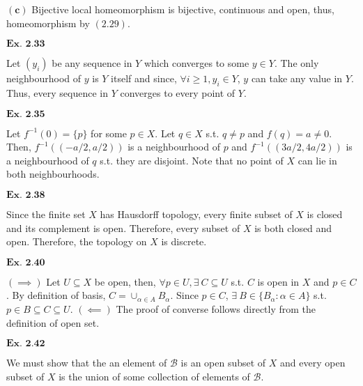 \documentclass{article}
\begin{document}
$\mathbf{(c)}$ Bijective local homeomorphism is bijective, continuous and open, thus, homeomorphism by $\mathbf{(2.29)}$.

\vspace{0.2in}

${\textbf{Ex. 2.33}}$

Let $(y_i)$ be any sequence in $Y$ which converges to some $y \in Y$. The only neighbourhood of $y$ is $Y$ itself and since, $\forall i \geq 1, y_i \in Y$, $y$ can take any value in $Y$. Thus, every sequence in $Y$ converges to every point of $Y$.

\vspace{0.2in}

${\textbf{Ex. 2.35}}$

Let $f^{-1}(0) = \{p\}$ for some $p \in X$. Let $q \in X$ s.t. $q \neq p$ and $f(q) = a \neq 0$. Then, $f^{-1}((-a/2, a/2))$ is a neighbourhood of $p$ and $f^{-1}((3a/2,4a/2))$ is a neighbourhood of $q$ s.t. they are disjoint. Note that no point of $X$ can lie in both neighbourhoods.

\vspace{0.2in}

${\textbf{Ex. 2.38}}$

Since the finite set $X$ has Hausdorff topology, every finite subset of $X$ is closed and its complement is open. Therefore, every subset of $X$ is both closed and open. Therefore, the topology on $X$ is discrete.

\vspace{0.2in}

${\textbf{Ex. 2.40}}$

$(\implies)$ Let $U\subseteq X$ be open, then, $\forall p \in U, \exists\ C \subseteq U$ s.t. $C$ is open in $X$ and $p\in C$. By definition of basis, $C = \cup_{\alpha \in A} B_{\alpha}$. Since $p \in C$, $\exists\ B \in \{B_{\alpha}:\alpha \in A\}$ s.t. $p \in B \subseteq C \subseteq U$. $(\impliedby)$ The proof of converse follows directly from the definition of open set.

\vspace{0.2in}

${\textbf{Ex. 2.42}}$

We must show that the an element of $\mathcal{B}$ is an open subset of $X$ and every open subset of $X$ is the union of some collection of elements of $\mathcal{B}$.\\~\\
\end{document}

